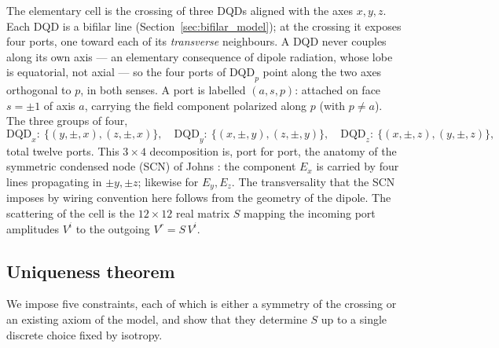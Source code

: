 \documentclass[11pt,a4paper]{article}
\theoremstyle{plain}
\theoremstyle{remark}
\begin{document}
The elementary cell is the crossing of three DQDs aligned with the axes $x,y,z$. Each DQD is a bifilar line (Section~\ref{sec:bifilar_model}); at the crossing it exposes four ports, one toward each of its \emph{transverse} neighbours. A DQD never couples along its own axis --- an elementary consequence of dipole radiation, whose lobe is equatorial, not axial --- so the four ports of $\text{DQD}_p$ point along the two axes orthogonal to $p$, in both senses. A port is labelled $(a,s,p)$: attached on face $s=\pm1$ of axis $a$, carrying the field component polarized along $p$ (with $p\neq a$). The three groups of four,
\begin{equation}\label{maxwell3d:groups}
\text{DQD}_x:\ \{(y,\pm,x),(z,\pm,x)\}, \quad
\text{DQD}_y:\ \{(x,\pm,y),(z,\pm,y)\}, \quad
\text{DQD}_z:\ \{(x,\pm,z),(y,\pm,z)\},
\end{equation}
total twelve ports. This $3\times4$ decomposition is, port for port, the anatomy of the symmetric condensed node (SCN) of Johns \cite{johns1987}: the component $E_x$ is carried by four lines propagating in $\pm y,\pm z$; likewise for $E_y,E_z$. The transversality that the SCN imposes by wiring convention here follows from the geometry of the dipole. The scattering of the cell is the $12\times12$ real matrix $S$ mapping the incoming port amplitudes $V^i$ to the outgoing $V^r = S\,V^i$.

\subsection{Uniqueness theorem}
\label{maxwell3d:theorem}

We impose five constraints, each of which is either a symmetry of the crossing or an existing axiom of the model, and show that they determine $S$ up to a single discrete choice fixed by isotropy.
\end{document}
